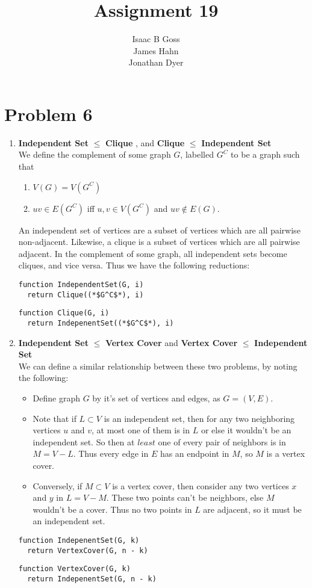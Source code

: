 \documentclass{article}
\author{Isaac B Goss\\ James Hahn\\ Jonathan Dyer}
\title{Assignment 19}
\providecommand{\prob}[1]{\section*{Problem #1}}
\providecommand{\reducible}[2]{
  \textbf{#1} $\leq$ \textbf{#2}
}
\begin{document}
\maketitle

\prob{6}

\begin{enumerate}
  \item \reducible{Independent Set}{Clique}, and \reducible{Clique}{Independent Set} \\
  We define the complement of some graph $G$, labelled $G^C$ to be a graph such that
  \begin{enumerate}
    \item $V(G) = V(G^C)$
    \item $uv \in E(G^C)$ iff $u,v \in V(G^C)$ and $uv \not\in E(G)$.
  \end{enumerate}
  An independent set of vertices are a subset of vertices which are all pairwise non-adjacent.
  Likewise, a clique is a subset of vertices which are all pairwise adjacent.
  In the complement of some graph, all independent sets become cliques, and vice versa.
  Thus we have the following reductions:
  \begin{lstlisting}
function IndependentSet(G, i)
  return Clique((*$G^C$*), i)
  \end{lstlisting}
  \begin{lstlisting}
function Clique(G, i)
  return IndepenentSet((*$G^C$*), i)
  \end{lstlisting}
  \item \reducible{Independent Set}{Vertex Cover} and \reducible{Vertex Cover}{Independent Set} \\
  We can define a similar relationship between these two problems, by noting the following:
  \begin{itemize}
    \item Define graph $G$ by it's set of vertices and edges, as $G = (V,E)$.
    \item Note that if $L \subset V$ is an independent set, then for any two neighboring vertices $u$ and $v$, at most one of them is in $L$ or else it wouldn't be an independent set. So then at $least$ one of every pair of neighbors is in $M = V - L$. Thus every edge in $E$ has an endpoint in $M$, so $M$ is a vertex cover.
    \item Conversely, if $M \subset V$ is a vertex cover, then consider any two vertices $x$ and $y$ in $L = V - M$. These two points can't be neighbors, else $M$ wouldn't be a cover. Thus no two points in $L$ are adjacent, so it must be an independent set.
  \end{itemize}
  \begin{lstlisting}
function IndepenentSet(G, k)
  return VertexCover(G, n - k)
  \end{lstlisting}
  \begin{lstlisting}
function VertexCover(G, k)
  return IndepenentSet(G, n - k)
  \end{lstlisting}
\end{enumerate}
\end{document}
